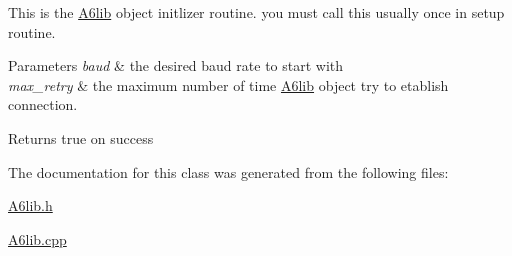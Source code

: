 This is the \mbox{\hyperlink{class_a6lib}{A6lib}} object initlizer routine. you must call this usually once in setup routine. 
\begin{DoxyParams}{Parameters}
{\em baud} & the desired baud rate to start with \\
\hline
{\em max\+\_\+retry} & the maximum number of time \mbox{\hyperlink{class_a6lib}{A6lib}} object try to etablish connection. \\
\hline
\end{DoxyParams}
\begin{DoxyReturn}{Returns}
true on success 
\end{DoxyReturn}


The documentation for this class was generated from the following files\+:\begin{DoxyCompactItemize}
\item 
\mbox{\hyperlink{_a6lib_8h}{A6lib.\+h}}\item 
\mbox{\hyperlink{_a6lib_8cpp}{A6lib.\+cpp}}\end{DoxyCompactItemize}
